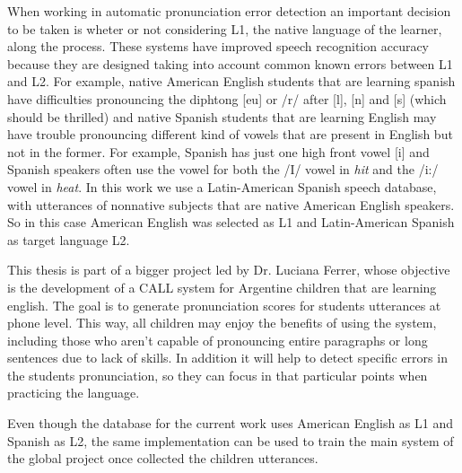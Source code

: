 When working in automatic pronunciation error detection an important decision to be taken is
wheter or not considering L1, the native language of the learner, along the process. These
systems have improved speech recognition accuracy because they are designed 
taking into account common known errors between L1 and L2. For example, native American English 
students that are learning spanish have difficulties pronouncing the diphtong [eu] or 
/r/ after [l], [n] and [s] (which should be thrilled) and native Spanish students 
that are learning English may have trouble pronouncing 
different kind of vowels that are present in English
but not in the former. For example, Spanish has just one high front vowel [i] 
and Spanish speakers often use the vowel for both the /I/ vowel in \textit{hit} and 
the /i:/ vowel in \textit{heat}. In this work we use a Latin-American Spanish speech 
database, with utterances of nonnative subjects that are native American English speakers.
So in this case American English was selected as L1 and Latin-American Spanish as target
language L2.

This thesis is part of a bigger project led by Dr. Luciana Ferrer, whose objective is 
the development of a CALL system for Argentine children that are learning english. The goal
is to generate pronunciation scores for students utterances at phone level. This way,
all children may enjoy the benefits of using the system, including those who aren't capable
of pronouncing entire paragraphs or long sentences due to lack of skills. In addition it will
help to detect specific errors in the students pronunciation, so they can focus in that
particular points when practicing the language.

Even though the database for the current work uses American English as L1 and Spanish as L2,
the same implementation can be used to train the main system of the global project once 
collected the children utterances.